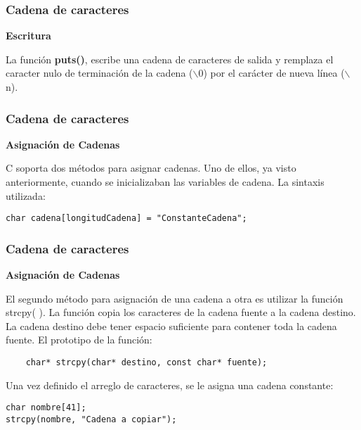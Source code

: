 \begin{frame}
    \frametitle{Cadena de caracteres}
    \begin{center}\textbf{Escritura}\end{center}
    La función \textbf{puts()}, escribe una cadena de caracteres de salida y remplaza el caracter nulo de terminación de la cadena ($\backslash$0) por el carácter de nueva línea ($\backslash$n).
\end{frame}



\begin{frame}[fragile]
    \frametitle{Cadena de caracteres}
    \begin{center}\textbf{Asignación de Cadenas}\end{center}
    \justify
    \hspace{5mm}C soporta dos métodos para asignar cadenas. Uno de ellos, ya visto anteriormente, cuando se inicializaban las variables de cadena. La sintaxis utilizada:
    \begin{lstlisting}
char cadena[longitudCadena] = "ConstanteCadena";
    \end{lstlisting}
\end{frame}


\begin{frame}[fragile]
    \frametitle{Cadena de caracteres}
    \begin{center}\textbf{Asignación de Cadenas}\end{center}
    \hspace{5mm}El segundo método para asignación de una cadena a otra es utilizar la función strcpy( ). La función copia los caracteres de la cadena fuente a la cadena destino. La cadena destino debe tener espacio suficiente para contener toda la cadena fuente. El prototipo de la función:
    \begin{lstlisting}
    char* strcpy(char* destino, const char* fuente);
    \end{lstlisting}
    Una vez definido el arreglo de caracteres, se le asigna una cadena constante:
    \begin{lstlisting}
char nombre[41];
strcpy(nombre, "Cadena a copiar");\end{lstlisting}
\end{frame}


